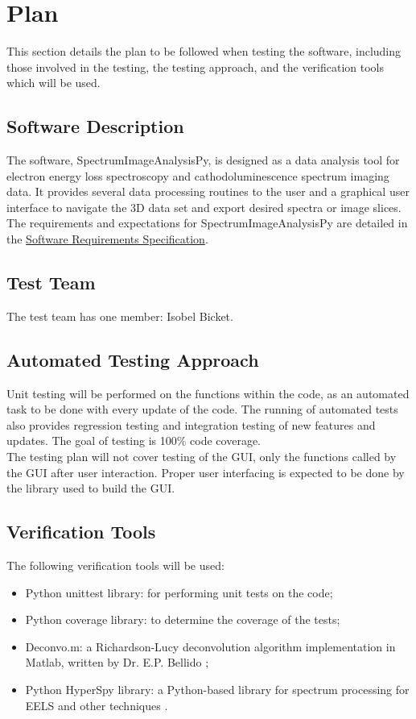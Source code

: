 \documentclass[12pt, titlepage]{article}
\newcommand{\progname}{SpectrumImageAnalysisPy}
\begin{document}
\section{Plan}
This section details the plan to be followed when testing the software,
including those involved in the testing, the testing approach, and the
verification tools which will be used.
	
\subsection{Software Description}
The software, \progname{}, is designed as a data analysis tool for electron
energy loss spectroscopy and cathodoluminescence spectrum imaging data. It
provides several data processing routines to the user and a graphical user
interface to navigate the 3D data set and export desired spectra or image
slices. The requirements and expectations for \progname{} are detailed in the
\hyperref[doc:SRS]{Software Requirements Specification}.

\subsection{Test Team}
The test team has one member: Isobel Bicket.

\subsection{Automated Testing Approach}

Unit testing will be performed on the functions within the code, as an automated
task to be done with every update of the code. The running of automated tests
also provides regression testing and integration testing of new features and
updates. The goal of testing is 100\% code coverage.\\
The testing plan will not cover testing of the GUI, only the functions called by
the GUI after user interaction. Proper user interfacing is expected to be done
by the library used to build the GUI.\\

\subsection{Verification Tools}
\label{subsec:VerificationTools}
The following verification tools will be used:
\begin{itemize}
	\item Python unittest library: for performing unit tests on the code;
	\item Python coverage library: to determine the coverage of the tests;
	\item Deconvo.m: a Richardson-Lucy deconvolution algorithm implementation in
Matlab, written by Dr. E.P. Bellido \cite{bellido_toward_2014};
	\item Python HyperSpy library: a Python-based library for spectrum processing
for EELS and other techniques \cite{francisco_de_la_pena_2017_583693}.
\end{itemize}
\end{document}
